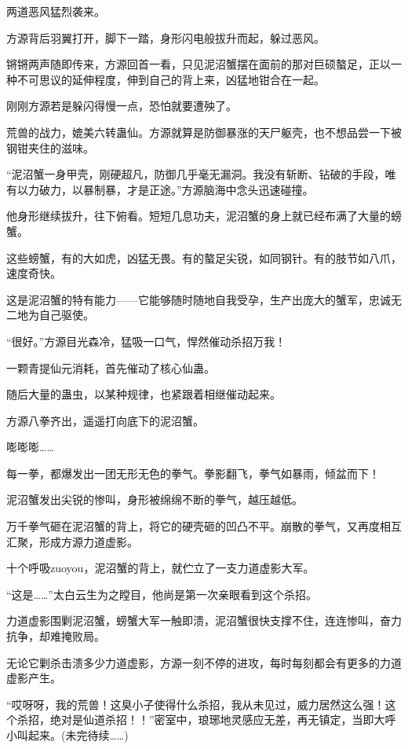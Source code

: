 \begin{this_body}
两道恶风猛烈袭来。

方源背后羽翼打开，脚下一踏，身形闪电般拔升而起，躲过恶风。

锵锵两声随即传来，方源回首一看，只见泥沼蟹摆在面前的那对巨硕螯足，正以一种不可思议的延伸程度，伸到自己的背上来，凶猛地钳合在一起。

刚刚方源若是躲闪得慢一点，恐怕就要遭殃了。

荒兽的战力，媲美六转蛊仙。方源就算是防御暴涨的天尸躯壳，也不想品尝一下被钢钳夹住的滋味。

“泥沼蟹一身甲壳，刚硬超凡，防御几乎毫无漏洞。我没有斩断、钻破的手段，唯有以力破力，以暴制暴，才是正途。”方源脑海中念头迅速碰撞。

他身形继续拔升，往下俯看。短短几息功夫，泥沼蟹的身上就已经布满了大量的螃蟹。

这些螃蟹，有的大如虎，凶猛无畏。有的螯足尖锐，如同钢针。有的肢节如八爪，速度奇快。

这是泥沼蟹的特有能力——它能够随时随地自我受孕，生产出庞大的蟹军，忠诚无二地为自己驱使。

“很好。”方源目光森冷，猛吸一口气，悍然催动杀招万我！

一颗青提仙元消耗，首先催动了核心仙蛊。

随后大量的蛊虫，以某种规律，也紧跟着相继催动起来。

方源八拳齐出，遥遥打向底下的泥沼蟹。

嘭嘭嘭……

每一拳，都爆发出一团无形无色的拳气。拳影翻飞，拳气如暴雨，倾盆而下！

泥沼蟹发出尖锐的惨叫，身形被绵绵不断的拳气，越压越低。

万千拳气砸在泥沼蟹的背上，将它的硬壳砸的凹凸不平。崩散的拳气，又再度相互汇聚，形成方源力道虚影。

十个呼吸zuoyou，泥沼蟹的背上，就伫立了一支力道虚影大军。

“这是……”太白云生为之瞠目，他尚是第一次亲眼看到这个杀招。

力道虚影围剿泥沼蟹，螃蟹大军一触即溃，泥沼蟹很快支撑不住，连连惨叫，奋力抗争，却难掩败局。

无论它剿杀击溃多少力道虚影，方源一刻不停的进攻，每时每刻都会有更多的力道虚影产生。

“哎呀呀，我的荒兽！这臭小子使得什么杀招，我从未见过，威力居然这么强！这个杀招，绝对是仙道杀招！！”密室中，琅琊地灵感应无差，再无镇定，当即大呼小叫起来。(未完待续……)

\end{this_body}

